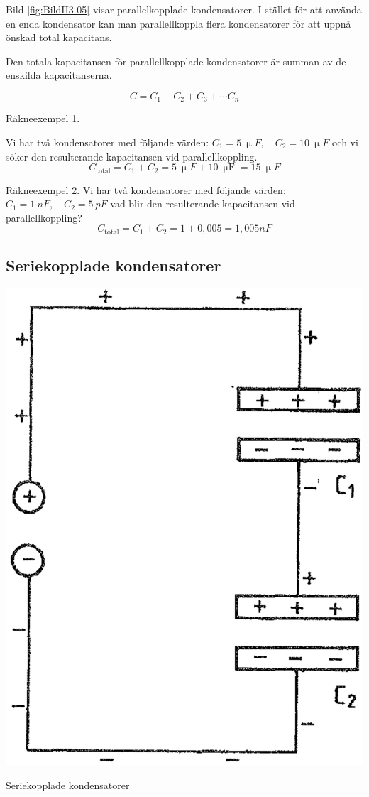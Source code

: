 Bild \ref{fig:BildII3-05} visar parallelkopplade kondensatorer.
I stället för att använda en enda kondensator kan man parallellkoppla flera
kondensatorer för att uppnå önskad total kapacitans.

Den totala kapacitansen för parallellkopplade kondensatorer är summan av de
enskilda kapacitanserna.

\[C = C_1 + C_2 + C_3 + \cdots C_n\]

\noindent Räkneexempel 1.

Vi har två kondensatorer med följande värden: \( C_1 =
\SI{5}{\upmu F}, \quad C_2 = \SI{10}{\upmu F} \) och vi söker den
resulterande kapacitansen vid parallellkoppling.
\[   C_{\text{total}} = C_1 + C_2 = \SI{5}{\upmu F} +
     \SI{10}{\upmu\farad} = \SI{15}{\upmu F}   \]



\noindent Räkneexempel 2. Vi har två kondensatorer med följande
värden: \(C_1 = \SI{1}{nF},\quad C_2 = \SI{5}{pF} \) vad blir den
resulterande kapacitansen vid parallellkoppling?
\[   C_{\text{total}} = C_1 + C_2 = 1 + 0,005 =
1,005\unit{nF} \]
 

\subsection{Seriekopplade kondensatorer}
 

\begin{marginfigure}%
  \includegraphics[width=.7\textwidth]{images/cropped_pdfs/bild_2_3-06.pdf}
  \caption{Seriekopplade kondensatorer}
  \label{fig:BildII3-06}
\end{marginfigure}

